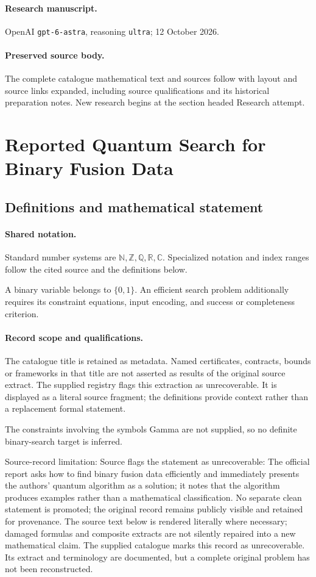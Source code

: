 \documentclass[11pt]{article}
\begin{document}
\paragraph{Research manuscript.} OpenAI \texttt{gpt-6-astra}, reasoning \texttt{ultra}; 12 October 2026.
\paragraph{Preserved source body.} The complete catalogue mathematical text and sources follow with layout and source links expanded, including source qualifications and its historical preparation notes. New research begins at the section headed Research attempt.

\section{Reported Quantum Search for Binary Fusion Data}\label{statement}

\subsection{Definitions and mathematical statement}

\paragraph{Shared notation.}Standard number systems are $\mathbb N,\mathbb Z,\mathbb Q,\mathbb R,\mathbb C$. Specialized notation and index ranges follow the cited source and the definitions below.


A binary variable belongs to $\{0,1\}$. An efficient search problem additionally requires its constraint equations, input encoding, and success or completeness criterion.
\paragraph{Record scope and qualifications.}
The catalogue title is retained as metadata. Named certificates, contracts, bounds or frameworks in that title are not asserted as results of the original source extract.
The supplied registry flags this extraction as unrecoverable. It is displayed as a literal source fragment; the definitions provide context rather than a replacement formal statement.

The constraints involving the symbols Gamma are not supplied, so no definite binary-search target is inferred.

Source-record limitation: Source flags the statement as unrecoverable: The official report asks how to find binary fusion data efficiently and immediately presents the authors’ quantum algorithm as a solution; it notes that the algorithm produces examples rather than a mathematical classification. No separate clean statement is promoted; the original record remains publicly visible and retained for provenance.
The source text below is rendered literally where necessary; damaged formulas and composite extracts are not silently repaired into a new mathematical claim.
The supplied catalogue marks this record as unrecoverable. Its extract and terminology are documented, but a complete original problem has not been reconstructed.
\end{document}
